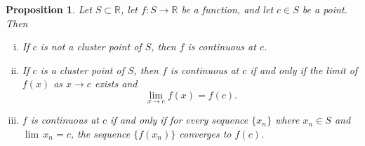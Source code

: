 \documentclass[12pt]{book}
\newcommand{\R}{{\mathbb{R}}}
\theoremstyle{plain}
\newtheorem{prop}[thm]{Proposition}
\theoremstyle{remark}
\theoremstyle{definition}
\theoremstyle{exercise}
\theoremstyle{example}
\begin{document}
\enlargethispage{\baselineskip}
\begin{prop} \label{contbasic:prop}
Let $S \subset \R$, let $f \colon S \to \R$ be a function, and let $c \in S$
be a point.
Then
\begin{enumerate}[(i)]
\item If $c$ is not a cluster point of $S$, then $f$ is continuous at $c$.
\item If $c$ is a cluster point of $S$, then $f$ is continuous at $c$
if and only if the limit of $f(x)$ as $x \to c$ exists and
\begin{equation*}
\lim_{x\to c} f(x) = f(c) .
\end{equation*}
\item $f$ is continuous at $c$ if and only if for every sequence $\{ x_n \}$
where $x_n \in S$ and $\lim\, x_n = c$, the sequence $\{ f(x_n) \}$ converges
to $f(c)$.
\end{enumerate}
\end{prop}
\end{document}
